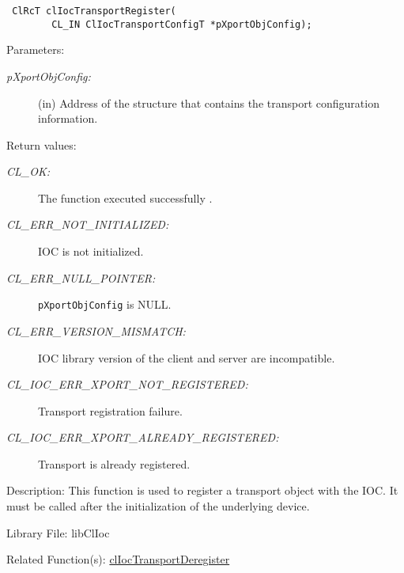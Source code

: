 \begin{flushleft}
\begin{Desc}
\footnotesize\begin{verbatim} ClRcT clIocTransportRegister(
        CL_IN ClIocTransportConfigT *pXportObjConfig);
\end{verbatim}
\normalsize
\end{Desc}
\begin{Desc}
\item[Parameters:]
\begin{description}
\item[{\em p\-Xport\-Obj\-Config:}](in) Address of the structure that contains the transport configuration information.\end{description}
\end{Desc}
\begin{Desc}
\item[Return values:]
\begin{description}
\item[{\em CL\_\-OK:}]The function executed successfully . 
\item[{\em CL\_\-ERR\_\-NOT\_\-INITIALIZED:}] IOC is not initialized. 
\item[{\em CL\_\-ERR\_\-NULL\_\-POINTER:}]{\tt{pXportObjConfig}} is NULL. 
\item[{\em CL\_\-ERR\_\-VERSION\_\-MISMATCH:}] IOC library version of the client and server are incompatible.
\item[{\em CL\_\-IOC\_\-ERR\_\-XPORT\_\-NOT\_\-REGISTERED:}]Transport registration failure. 
\item[{\em CL\_\-IOC\_\-ERR\_\-XPORT\_\-ALREADY\_\-REGISTERED:}]Transport is already registered.\end{description}
\end{Desc}
\begin{Desc}
\item[Description:]This function is used to register a transport object with the IOC. It must be called after the initialization of the underlying 
device.
\end{Desc}
\begin{Desc}
\item[Library File:]libClIoc\end{Desc}
\begin{Desc}
\item[Related Function(s):]\hyperlink{pageioc119}{cl\-Ioc\-Transport\-Deregister} \end{Desc}
\newpage



\end{flushleft}
